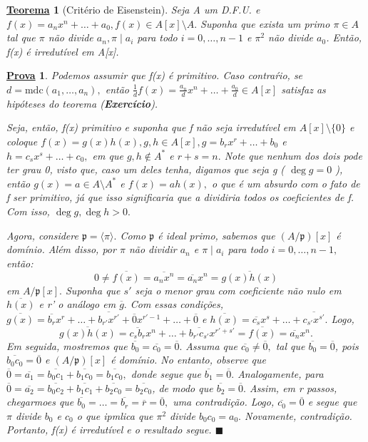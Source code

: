 \documentclass{article}
\newtheorem*{theorem*}{\underline{Teorema}}
\newtheorem*{proof*}{\underline{Prova}}
\renewcommand\qedsymbol{$\blacksquare$}
\begin{document}
\begin{theorem*}[Critério de Eisenstein]
  Seja A um D.F.U. e \(f(x) = a_{n}x^{n} + \dotsc + a_{0}, f(x)\in A[x]\setminus{A}.\) Suponha que exista um primo \(\pi \in A\) tal que 
 \(\pi \) não divide \(a_{n}, \pi \mid a_{i}\) para todo \(i=0, \dotsc , n-1\) e \(\pi^{2}\) não divide \(a_{0}\). Então, f(x) é irredutível em 
 A[x].
\end{theorem*}
\begin{proof*}
  Podemos assumir que f(x) é primitivo. Caso contraŕio, se \(d = \mathrm{mdc}(a_{1}, \dotsc ,a_{n}),\) então
  \(\frac{1}{d}f(x) = \frac{a_{n}}{d}x^{n} + \dotsc + \frac{a_{0}}{d}\in A[x]\) satisfaz as hipóteses do teorema (\textbf{Exercício}).

  Seja, então, f(x) primitivo e suponha que f não seja irredutível em \(A[x]\setminus{\{0\}}\) e coloque
 \(f(x) = g(x)h(x), g, h\in A[x], g = b_{r}x^{r} + \dotsc  + b_{0}\) e \(h = c_{s}x^{s} + \dotsc +c_{0},\) em que
 \(g,h\not\in A^{*}\) e \(r+s = n.\) Note que nenhum dos dois pode ter grau 0, visto que, caso um deles tenha, digamos que seja g ( \(\deg{g} = 0\) ), então
 \(g(x)=a\in A\setminus{A^{*}}\) e \(f(x) = ah(x),\) o que é um absurdo com o fato de f ser primitivo, já que isso significaria que a dividiria todos os coeficientes
 de f. Com isso, \(\deg{g}, \deg{h} > 0.\)

  Agora, considere \(\mathfrak{p} = \langle \pi  \rangle.\) Como \(\mathfrak{p}\) é ideal primo, sabemos que 
 \((A/\mathfrak{p})[x]\) é domínio. Além disso, por \(\pi \) não dividir \(a_{n}\) e \(\pi \mid a_{i}\) para todo \(i=0, \dotsc , n-1,\) então:
  \[
    0\neq \overline{f(x)} = \overline{a_{n}x^{n}} = \overline{a_{n}}x^{n} = \overline{g(x)h(x)}
  \]
em \(A/\mathfrak{p}[x].\) Suponha que \(s'\) seja o menor grau com coeficiente não nulo em \(\overline{h(x)}\) e r' o análogo em \(\overline{g}.\) 
Com essas condições, \(\overline{g(x)} = \overline{b_{r}}x^{r} + \dotsc + \overline{b_{r'}x^{r'}} + \overline{0}x^{r'-1} + \dotsc + \overline{0}\) e
 \(\overline{h(x)} = \overline{c_{s}}x^{s} + \dotsc + \overline{c_{s'}x^{s'}}.\) Logo, 
  \[
    \overline{g(x)h(x)} = \overline{c_{s}b_{r}}x^{n} + \dotsc + \overline{b_{r'}c_{s'}}x^{r'+s'} = \overline{f(x)} = \overline{a_{n}}x^{n}.
  \]
  Em seguida, mostremos que \(\overline{b_{0}} = \overline{c_{0}} = \overline{0}.\) Assuma que \(\overline{c_{0}}\neq \overline{0},\) tal que \(\overline{b_{0}}=\overline{0}\), pois
 \(\overline{b_{0}c_{0}} = \overline{0}\) e \((A/\mathfrak{p})[x]\) é domínio. No entanto, observe que \(\overline{0} = \overline{a_{1}} = \overline{b_{0}c_{1}} + \overline{b_{1}c_{0}} = \overline{b_{1}c_{0}},\)
 donde segue que \(\overline{b_{1}} = \overline{0}.\) Analogamente, para \(\overline{0} = \overline{a_{2}} = \overline{b_{0}c_{2}}+\overline{b_{1}c_{1}}+\overline{b_{2}c_{0}} = \overline{b_{2}c_{0}}\),
 de modo que \(\overline{b_{2}} = \overline{0}.\) Assim, em r passos, chegarmoes que \(\overline{b_{0}} = \dotsc = \overline{b_{r}} = \overline{r} = \overline{0},\) uma contradição.
 Logo, \(\overline{c_{0}} = \overline{0}\) e segue que \(\pi \) divide \(b_{0}\) e \(c_{0}\) o que ipmlica que \(\pi^{2}\) divide \(b_{0}c_{0} = a_{0}.\) Novamente, 
 contradição. Portanto, f(x) é irredutível e o resultado segue. \qedsymbol
\end{proof*}
\end{document}
